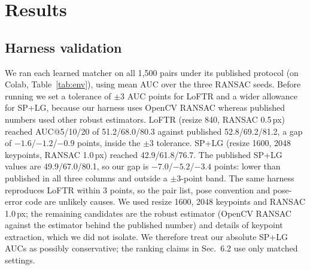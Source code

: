\documentclass[10pt,twocolumn,letterpaper]{article}
\begin{document}
\section{Results}
\subsection{Harness validation}
We ran each learned matcher on all 1,500 pairs under its published protocol (on Colab, Table~\ref{tab:env}), using mean AUC over the three RANSAC seeds. Before running we set a tolerance of $\pm3$ AUC points for LoFTR and a wider allowance for SP+LG, because our harness uses OpenCV RANSAC whereas published numbers used other robust estimators. LoFTR (resize 840, RANSAC 0.5\,px) reached AUC@5/10/20 of 51.2/68.0/80.3 against published 52.8/69.2/81.2, a gap of $-1.6$/$-1.2$/$-0.9$ points, inside the $\pm3$ tolerance. SP+LG (resize 1600, 2048 keypoints, RANSAC 1.0\,px) reached 42.9/61.8/76.7. The published SP+LG values are 49.9/67.0/80.1, so our gap is $-7.0$/$-5.2$/$-3.4$ points: lower than published in all three columns and outside a $\pm3$-point band. The same harness reproduces LoFTR within 3 points, so the pair list, pose convention and pose-error code are unlikely causes. We used resize 1600, 2048 keypoints and RANSAC 1.0\,px; the remaining candidates are the robust estimator (OpenCV RANSAC against the estimator behind the published number) and details of keypoint extraction, which we did not isolate. We therefore treat our absolute SP+LG AUCs as possibly conservative; the ranking claims in Sec.~6.2 use only matched settings.
\end{document}

